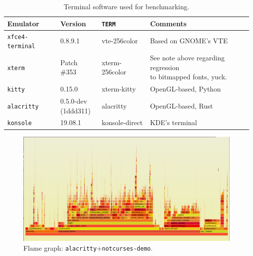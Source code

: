 \begin{table}[!htb]
  \centering
  \begin{tabular}{|l|l|l|l|}
    \hline
    Emulator & Version & \texttt{TERM} & Comments \\
    \hline
    \hline
    \texttt{xfce4-terminal} & 0.8.9.1 & vte-256color & Based on GNOME's VTE\cite{gnomevte} \\
    \hline
    \texttt{xterm} & Patch \#353 & xterm-256color & \makecell[l]{See note above regarding regression\\
      to bitmapped fonts, yuck.} \\
    \hline
    \texttt{kitty} & 0.15.0 & xterm-kitty & OpenGL-based, Python \\
    \hline
    \texttt{alacritty} & \makecell[l]{0.5.0-dev\\(1ddd311)} & alacritty & OpenGL-based, Rust \\
    \hline
    \texttt{konsole} & 19.08.1 & konsole-direct & KDE's terminal \\
    \hline
  \end{tabular}
\caption{Terminal software used for benchmarking.}
\label{table:benchterms}
\end{table}

\begin{figure}[!htb]
\centering
\includegraphics[width=1\textwidth]{media/fg-demo-alacritty.png}
\caption{Flame graph: \texttt{alacritty}+\texttt{notcurses-demo}.}
\label{fig:fg-demo-alacritty}
\end{figure}


